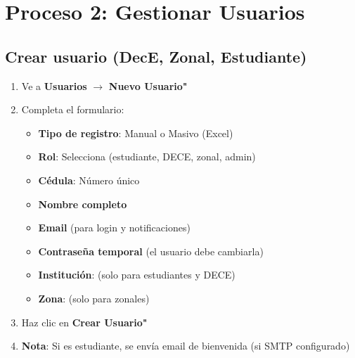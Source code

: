 \documentclass[12pt, a4paper]{report}
\begin{document}
\section{Proceso 2: Gestionar Usuarios}

\subsection{Crear usuario (DecE, Zonal, Estudiante)}
\begin{enumerate}
    \item Ve a \textbf{Usuarios} $\rightarrow$ \textbf{Nuevo Usuario"}
    \item Completa el formulario:
    \begin{itemize}
        \item \textbf{Tipo de registro}: Manual o Masivo (Excel)
        \item \textbf{Rol}: Selecciona (estudiante, DECE, zonal, admin)
        \item \textbf{Cédula}: Número único
        \item \textbf{Nombre completo}
        \item \textbf{Email} (para login y notificaciones)
        \item \textbf{Contraseña temporal} (el usuario debe cambiarla)
        \item \textbf{Institución}: (solo para estudiantes y DECE)
        \item \textbf{Zona}: (solo para zonales)
    \end{itemize}
    \item Haz clic en \textbf{Crear Usuario"}
    \item \textbf{Nota}: Si es estudiante, se envía email de bienvenida (si SMTP configurado)
\end{enumerate}
\end{document}
